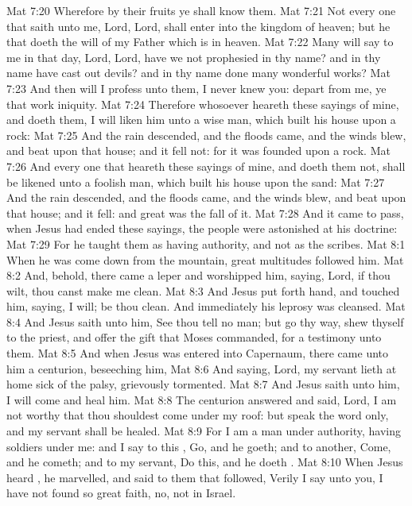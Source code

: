 \vs Mat 7:20 Wherefore by their fruits ye shall know them.
\vs Mat 7:21 Not every one that saith unto me, Lord, Lord, shall enter into the kingdom of heaven; but he that doeth the will of my Father which is in heaven.
\vs Mat 7:22 Many will say to me in that day, Lord, Lord, have we not prophesied in thy name? and in thy name have cast out devils? and in thy name done many wonderful works?
\vs Mat 7:23 And then will I profess unto them, I never knew you: depart from me, ye that work iniquity.
\vs Mat 7:24 Therefore whosoever heareth these sayings of mine, and doeth them, I will liken him unto a wise man, which built his house upon a rock:
\vs Mat 7:25 And the rain descended, and the floods came, and the winds blew, and beat upon that house; and it fell not: for it was founded upon a rock.
\vs Mat 7:26 And every one that heareth these sayings of mine, and doeth them not, shall be likened unto a foolish man, which built his house upon the sand:
\vs Mat 7:27 And the rain descended, and the floods came, and the winds blew, and beat upon that house; and it fell: and great was the fall of it.
\vs Mat 7:28 And it came to pass, when Jesus had ended these sayings, the people were astonished at his doctrine:
\vs Mat 7:29 For he taught them as  having authority, and not as the scribes.
\vs Mat 8:1 When he was come down from the mountain, great multitudes followed him.
\vs Mat 8:2 And, behold, there came a leper and worshipped him, saying, Lord, if thou wilt, thou canst make me clean.
\vs Mat 8:3 And Jesus put forth  hand, and touched him, saying, I will; be thou clean. And immediately his leprosy was cleansed.
\vs Mat 8:4 And Jesus saith unto him, See thou tell no man; but go thy way, shew thyself to the priest, and offer the gift that Moses commanded, for a testimony unto them.
\vs Mat 8:5 And when Jesus was entered into Capernaum, there came unto him a centurion, beseeching him,
\vs Mat 8:6 And saying, Lord, my servant lieth at home sick of the palsy, grievously tormented.
\vs Mat 8:7 And Jesus saith unto him, I will come and heal him.
\vs Mat 8:8 The centurion answered and said, Lord, I am not worthy that thou shouldest come under my roof: but speak the word only, and my servant shall be healed.
\vs Mat 8:9 For I am a man under authority, having soldiers under me: and I say to this , Go, and he goeth; and to another, Come, and he cometh; and to my servant, Do this, and he doeth .
\vs Mat 8:10 When Jesus heard , he marvelled, and said to them that followed, Verily I say unto you, I have not found so great faith, no, not in Israel.
